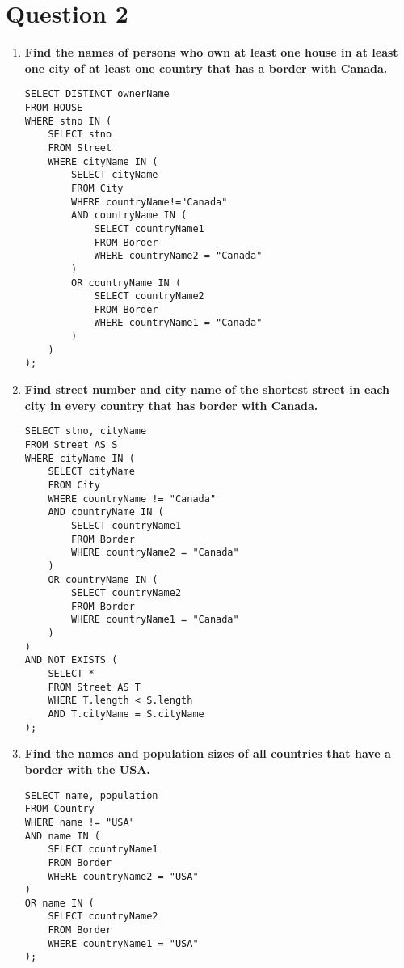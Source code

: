 \documentclass{article}
\begin{document}
\section*{Question 2}
\begin{enumerate}
\item \textbf{Find the names of persons who own at least one house in at least one city of at least one country that has a border with Canada.}
\begin{verbatim}
SELECT DISTINCT ownerName 
FROM HOUSE 
WHERE stno IN (
    SELECT stno 
    FROM Street 
    WHERE cityName IN (
        SELECT cityName 
        FROM City 
        WHERE countryName!="Canada" 
        AND countryName IN (
            SELECT countryName1 
            FROM Border 
            WHERE countryName2 = "Canada"
        )	 
        OR countryName IN (
            SELECT countryName2 
            FROM Border 
            WHERE countryName1 = "Canada"
        ) 
    )
);
\end{verbatim}

\item \textbf{Find street number and city name of the shortest street in each city in every country that has border with Canada.}
\begin{verbatim}
SELECT stno, cityName 
FROM Street AS S 
WHERE cityName IN (
    SELECT cityName 
    FROM City 
    WHERE countryName != "Canada" 
    AND countryName IN (
        SELECT countryName1 
        FROM Border 
        WHERE countryName2 = "Canada"
    ) 
    OR countryName IN (
        SELECT countryName2 
        FROM Border 
        WHERE countryName1 = "Canada"
    ) 
)
AND NOT EXISTS (
    SELECT * 
    FROM Street AS T 
    WHERE T.length < S.length 
    AND T.cityName = S.cityName 
);
\end{verbatim}

\newpage

\item \textbf{Find the names and population sizes of all countries that have a border with the USA.}
\begin{verbatim}
SELECT name, population 
FROM Country 
WHERE name != "USA" 
AND name IN (
    SELECT countryName1 
    FROM Border 
    WHERE countryName2 = "USA"
) 
OR name IN (
    SELECT countryName2 
    FROM Border 
    WHERE countryName1 = "USA"
);
\end{verbatim}


\end{enumerate}
\end{document}
